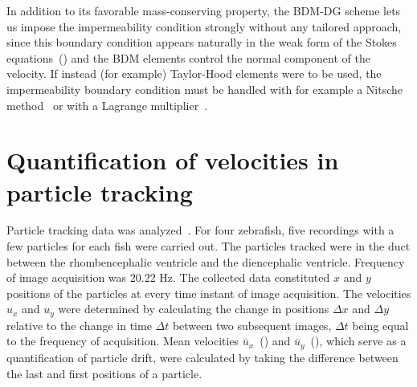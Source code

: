 \documentclass{WileyMSP-template}
\begin{document}
In addition to its favorable mass-conserving property, the BDM-DG scheme
lets us impose the impermeability condition strongly without any tailored approach,
since this boundary condition appears naturally in the weak form of the
Stokes equations~() and the BDM elements control
the normal component of the velocity. If instead (for example) Taylor-Hood
elements were to be used, the impermeability boundary condition must
be handled with for example a Nitsche method~\cite{Nitsche1971UberSind}
or with a Lagrange multiplier~\cite{Babuska1973TheMultipliers,
Bertoluzza2017BoundaryHemodynamics}.

\section{Quantification of velocities in particle tracking}\label{sec:appC_particle_transport}
Particle tracking data was analyzed~\cite{Olstad2019CiliaryDevelopment}.
For four zebrafish, five recordings with a few particles for each fish were carried out.
The particles tracked were in the duct between the rhombencephalic ventricle and the
diencephalic ventricle. Frequency of image acquisition was 20.22 Hz.
The collected data constituted $x$ and $y$ positions of the particles at every time
instant of image acquisition. The velocities $u_x$ and $u_y$ were determined by
calculating the change in positions $\Delta x$ and $\Delta y$ relative to the change
in time $\Delta t$ between two subsequent images, $\Delta t$ being equal to the
frequency of acquisition.
Mean velocities $\overline{u}_x$~() and
$\overline{u}_y$~(),
which serve as a quantification of particle drift, were calculated
by taking the difference between the last and first positions of a particle.
\end{document}

